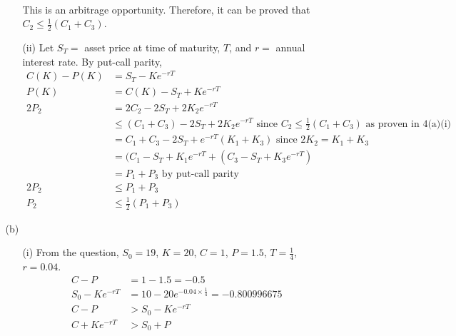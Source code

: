 \documentclass{article}
\begin{document}
\begin{enumerate}
\begin{itemize}
\begin{itemize}
\\
This is an arbitrage opportunity. Therefore, it can be proved that $C_2\leq\frac{1}{2}(C_1+C_3)$.
\item[(ii)]
Let $S_T=$ asset price at time of maturity, $T$, and $r=$ annual interest rate.
\newline
By put-call parity,
\begin{align*}
C(K)-P(K)&=S_T-Ke^{-rT} \\
P(K)&=C(K)-S_T+Ke^{-rT} \\
2P_2&=2C_2-2S_T+2K_2e^{-rT} \\
&\leq(C_1+C_3)-2S_T+2K_2e^{-rT} \text{ \ \ since } C_2\leq\frac{1}{2}(C_1+C_3) \text{ as proven in 4(a)(i)} \\
&=C_1+C_3-2S_T+e^{-rT}(K_1+K_3) \text{\ \ \ since } 2K_2=K_1+K_3 \\
&=(C_1-S_T+K_1e^{-rT}+(C_3-S_T+K_3e^{-rT}) \\ 
&=P_1+P_3 \text{ \ \ by put-call parity} \\
2P_2 &\leq P_1+P_3 \\
P_2 &\leq \frac{1}{2}(P_1+P_3)
\end{align*}

\end{itemize}
\item[(b)]
\begin{itemize}
\item[(i)]
From the question, $S_0=19$, $K=20$, $C=1$, $P=1.5$, $T=\frac{1}{4}$, $r=0.04$.
\begin{align*}
    C-P&=1-1.5=-0.5\\
    S_0-Ke^{-rT}&=10-20e^{-0.04\times \frac{1}{4}}=-0.800996675\\
    C-P&>S_0-Ke^{-rT}\\
    C+Ke^{-rT}&>S_0+P
\end{align*}


\end{itemize}
\end{itemize}
\end{enumerate}
\end{document}
